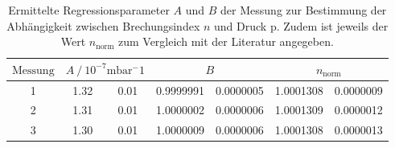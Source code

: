 \begin{table} 
\centering 
\caption{Ermittelte Regressionsparameter $A$ und $B$ der Messung zur Bestimmung der Abhängigkeit zwischen Brechungsindex $n$ und Druck p. Zudem ist jeweils der Wert $n_{\mathup{norm}}$ zum Vergleich mit der Literatur angegeben.} 
\label{tab: fitparams_druck} 
\begin{tabular}{S S[table-format=1.2]@{${}\pm{}$} S[table-format=1.2] S[table-format=1.7]@{${}\pm{}$} S[table-format=1.7] S[table-format=1.7]@{${}\pm{}$} S[table-format=1.7] } 
\toprule  
{$\text{Messung}$} &  &  &  \\ 
 & 1.32 & 0.01 & 0.9999991 & 0.0000005 & 1.0001308 & 0.0000009\\ 
2 & 1.31 & 0.01 & 1.0000002 & 0.0000006 & 1.0001309 & 0.0000012\\ 
3 & 1.30 & 0.01 & 1.0000009 & 0.0000006 & 1.0001308 & 0.0000013\\ 
\bottomrule 
\end{tabular} 
\end{table}
